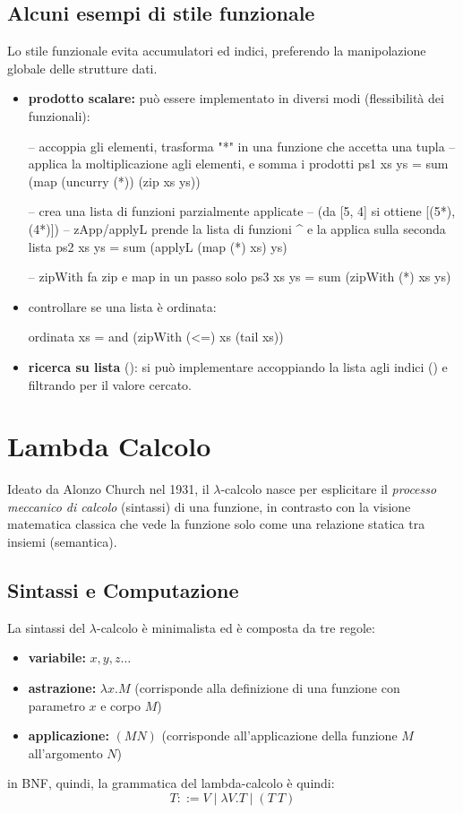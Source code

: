 \documentclass[a4paper,11pt]{report}
\begin{document}
\section{Alcuni esempi di stile funzionale}
Lo stile funzionale evita accumulatori ed indici, preferendo la manipolazione globale delle strutture dati.

\begin{itemize}
    \item \textbf{prodotto scalare:} può essere implementato in diversi modi (flessibilità dei funzionali):

\begin{haskellbox}{}
-- accoppia gli elementi, trasforma "*" in una funzione che accetta una tupla
-- applica la moltiplicazione agli elementi, e somma i prodotti
ps1 xs ys = sum (map (uncurry (*)) (zip xs ys))

-- crea una lista di funzioni parzialmente applicate
-- (da [5, 4] si ottiene [(5*), (4*)])
-- zApp/applyL prende la lista di funzioni ^ e la applica sulla seconda lista
ps2 xs ys = sum (applyL (map (*) xs) ys)

-- zipWith fa zip e map in un passo solo
ps3 xs ys = sum (zipWith (*) xs ys)
\end{haskellbox}

    \item controllare se una lista è ordinata:
\begin{haskellbox}{}
ordinata xs = and (zipWith (<=) xs (tail xs))
\end{haskellbox}

\item \textbf{ricerca su lista} (): si può implementare accoppiando la lista agli indici () e filtrando per il valore cercato.
\end{itemize}

\chapter{Lambda Calcolo}
Ideato da Alonzo Church nel 1931, il $\lambda$-calcolo nasce per esplicitare il \textit{processo meccanico di calcolo} (sintassi) di una funzione, in contrasto con la visione matematica classica che vede la funzione solo come una relazione statica tra insiemi (semantica).

\section{Sintassi e Computazione}
La sintassi del $\lambda$-calcolo è minimalista ed è composta da tre regole:
\begin{itemize}
    \item \textbf{variabile:} $x, y, z \dots$
    \item \textbf{astrazione:} $\lambda x. M$ (corrisponde alla definizione di una funzione con parametro $x$ e corpo $M$)
    \item \textbf{applicazione:} $(M N)$ (corrisponde all'applicazione della funzione $M$ all'argomento $N$)
\end{itemize}
\vspace{0.5em}
in BNF, quindi, la grammatica del lambda-calcolo è quindi:
$$T ::= V \mid \lambda V.T \mid (T \ T)$$
\end{document}
